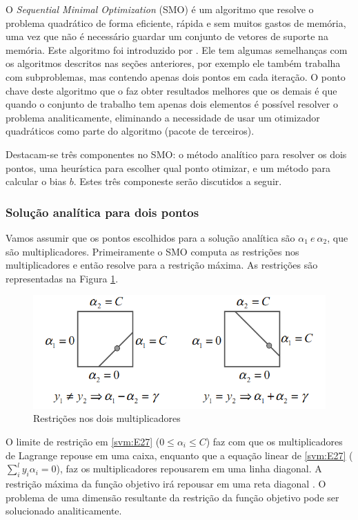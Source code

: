 O \textit{Sequential Minimal Optimization} (SMO) é um algoritmo que resolve o problema quadrático de forma eficiente, rápida e sem muitos gastos de memória, uma vez que não é necessário guardar um conjunto de vetores de suporte na memória. Este algoritmo foi introduzido por \cite{Platt1999}. Ele tem algumas semelhanças com os algoritmos descritos nas seções anteriores, por exemplo ele também trabalha com subproblemas, mas contendo apenas dois pontos em cada iteração. O ponto chave deste algoritmo que o faz obter resultados melhores que os demais é que quando o conjunto de trabalho tem apenas dois elementos é possível resolver o problema analiticamente, eliminando a necessidade de usar um otimizador quadráticos como parte do algoritmo (pacote de terceiros). 

Destacam-se três componentes no SMO: o método analítico para resolver os dois pontos, uma heurística para escolher qual ponto otimizar, e um método para calcular o bias $b$. Estes três componeste serão discutidos a seguir.

\subsubsection{Solução analítica para dois pontos}

Vamos assumir que os pontos escolhidos para a solução analítica são $\alpha_{1} \ e \  \alpha_{2}$, que são multiplicadores. Primeiramente o SMO computa as restrições nos multiplicadores e então resolve para a restrição máxima. As restrições são representadas na Figura \ref{fig:smo-restric}.

\begin{figure}[htb]
	\centering
	\includegraphics[scale=0.7]{./figuras/smo-restric.png}
	\caption{Restrições nos dois multiplicadores}
	\label{fig:smo-restric}
\end{figure}

O limite de restrição em \ref{svm:E27} ($0 \leq \alpha_{i} \leq C$) faz com que os multiplicadores de Lagrange repouse em uma caixa, enquanto que a equação linear de \ref{svm:E27} ($\sum_{i}^l y_{i}\alpha_{i} = 0$), faz os multiplicadores repousarem em uma linha diagonal. A restrição máxima da função objetivo irá repousar em uma reta diagonal \cite{Platt1999}. O problema de uma dimensão resultante da restrição da função objetivo pode ser solucionado analiticamente.

